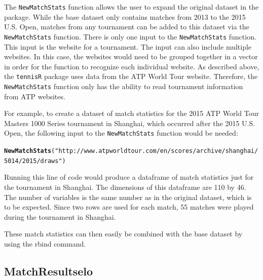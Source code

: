 \documentclass{article}\usepackage[]{graphicx}\usepackage[]{color}
\makeatletter
\newcommand{\hlstr}[1]{\textcolor[rgb]{0.192,0.494,0.8}{#1}}%
\newcommand{\hlstd}[1]{\textcolor[rgb]{0.345,0.345,0.345}{#1}}%
\newcommand{\hlkwd}[1]{\textcolor[rgb]{0.737,0.353,0.396}{\textbf{#1}}}%
\newenvironment{kframe}{%
 \def\at@end@of@kframe{}%
 \ifinner\ifhmode%
  \def\at@end@of@kframe{\end{minipage}}%
  \begin{minipage}{\columnwidth}%
 \fi\fi%
 \def\FrameCommand##1{\hskip\@totalleftmargin \hskip-\fboxsep
 \colorbox{shadecolor}{##1}\hskip-\fboxsep
     \hskip-\linewidth \hskip-\@totalleftmargin \hskip\columnwidth}%
 \MakeFramed {\advance\hsize-\width
   \@totalleftmargin\z@ \linewidth\hsize
   \@setminipage}}%
 {\par\unskip\endMakeFramed%
 \at@end@of@kframe}
\newenvironment{knitrout}{}{} %
\numberwithin{equation}{section} %
\newcommand{\pkg}[1]{{\texttt{#1}}}
\makeatother
\begin{document}
The \texttt{NewMatchStats} function allows the user to expand the original dataset in the package.  While the base dataset only contains matches from 2013 to the 2015 U.S. Open, matches from any tournament can be added to this dataset via the \texttt{NewMatchStats} function.  There is only one input to the \texttt{NewMatchStats} function.  This input is the website for a tournament.  The input can also include multiple websites.  In this case, the websites would need to be grouped together in a vector in order for the function to recognize each individual website.  As described above, the \pkg{tennisR} package uses data from the ATP World Tour website.  Therefore, the \texttt{NewMatchStats} function only has the ability to read tournament information from ATP websites.  

For example, to create a dataset of match statistics for the 2015 ATP World Tour Masters 1000 Series tournament in Shanghai, which occurred after the 2015 U.S. Open, the following input to the \texttt{NewMatchStats} function would be needed:

\begin{knitrout}
\color{fgcolor}\begin{kframe}
\begin{alltt}
\hlkwd{NewMatchStats}\hlstd{(}\hlstr{"http://www.atpworldtour.com/en/scores/archive/shanghai/5014/2015/draws"}\hlstd{)}
\end{alltt}
\end{kframe}
\end{knitrout}

Running this line of code would produce a dataframe of match statistics just for the tournament in Shanghai.  The dimensions of this dataframe are 110 by 46.  The number of variables is the same number as in the original dataset, which is to be expected.  Since two rows are used for each match, 55 matches were played during the tournament in Shanghai.

These match statistics can then easily be combined with the base dataset by using the rbind command.

\subsection{MatchResultselo}
\end{document}
